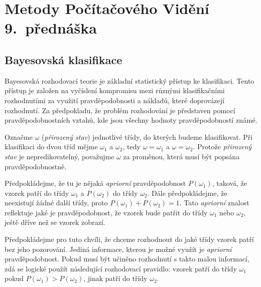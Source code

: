 




\chapter{Metody Počítačového Vidění 9.~přednáška}










\section{Bayesovská klasifikace}
\par{Bayesovská rozhodovací teorie je základní statistický přístup ke klasifikaci. Tento přístup je založen na vyčíslení kompromisu mezi různými klasifikačními rozhodnutími za využití pravděpodobnosti a nákladů, které doprovázejí rozhodnutí. Za předpokladu, že problém rozhodování je představen pomocí pravděpodobnostních vztahů, kde jsou všechny hodnoty pravděpodobností známé.}

\par{Označme $\omega$ (\textit{přirozený stav}) jednotlivé třídy, do kterých budeme klasifikovat. Při klasifikaci do dvou tříd mějme $\omega_1$ a $\omega_2$, tedy $\omega = \omega_1$ a $\omega = \omega_2$. Protože \textit{přirozený stav} je nepredikovatelný, považujme $\omega$ za proměnou, která musí být popsána pravděpodobnostně.}

\par{Předpokládejme, že tu je nějaká \textit{apriorní} pravděpodobnost $P(\omega_1)$, taková, že vzorek patří do třídy $\omega_1$ a $P(\omega_2)$ do třídy $\omega_2$. Dále předpokládejme, že neexistují žádné další třídy, proto $P(\omega_1) + P(\omega_2) = 1$. Tato \textit{apriorní} znalost reflektuje jaké je pravděpodobnost, že vzorek bude patřit do třídy $\omega_1$ nebo $\omega_2$, ještě dříve než se vzorek zobrazí.}

\par{Předpokládejme pro tuto chvíli, že chceme rozhodnout do jaké třídy vzorek patří bez jeho pozorování. Jediná informace, kterou je možné využít je \textit{apriorní} pravděpodobnost. Pokud musí být učiněno rozhodnutí s takto malou informací, zdá se logické použít následující rozhodovací pravidlo: vzorek patří do třídy $\omega_1$ pokud $P(\omega_1) > P(\omega_2)$, jinak patří do třídy $\omega_2$.}

